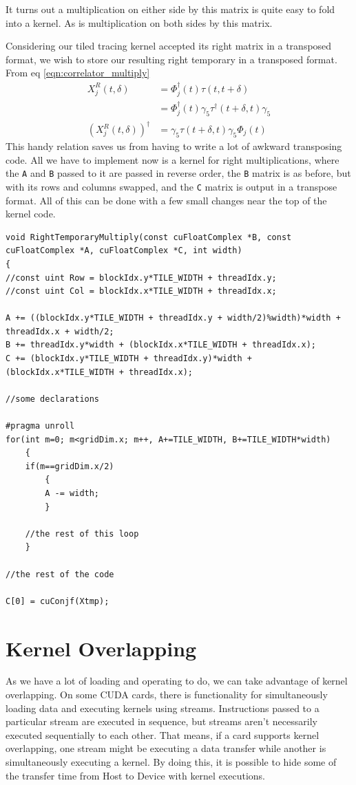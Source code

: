 \documentclass[a4paper,12pt]{report}
\begin{document}
It turns out a multiplication on either side by this matrix is quite easy to fold into a kernel.
As is multiplication on both sides by this matrix.

Considering our tiled tracing kernel accepted its right matrix in a transposed format, we wish to store our resulting right temporary in a transposed format.
From eq \ref{eqn:correlator_multiply}
%
\begin{align}
X^R_j(t,\delta) &=\Phi^\dagger_j(t) \tau(t,t+\delta)\\
		&=\Phi^\dagger_j(t) \gamma_5 \tau^\dagger(t+\delta, t ) \gamma_5\\
%
(X^R_j(t,\delta))^\dagger &= \gamma_5 \tau(t+\delta, t) \gamma_5 \Phi_j(t)
\end{align}
%
This handy relation saves us from having to write a lot of awkward transposing code.
All we have to implement now is a kernel for right multiplications, where the \verb!A! and \verb!B! passed to it are passed in reverse order, the \verb!B! matrix is as before, but with its rows and columns swapped, and the \verb!C! matrix is output in a transpose format.
All of this can be done with a few small changes near the top of the kernel code.

\begin{lstlisting}[float,caption=Multiplication Kernel To Generate The Right Temporary Matrices, label=lst:rightTemporary_kernel]
void RightTemporaryMultiply(const cuFloatComplex *B, const cuFloatComplex *A, cuFloatComplex *C, int width)
{
//const uint Row = blockIdx.y*TILE_WIDTH + threadIdx.y;
//const uint Col = blockIdx.x*TILE_WIDTH + threadIdx.x;

A += ((blockIdx.y*TILE_WIDTH + threadIdx.y + width/2)%width)*width + threadIdx.x + width/2;
B += threadIdx.y*width + (blockIdx.x*TILE_WIDTH + threadIdx.x);
C += (blockIdx.y*TILE_WIDTH + threadIdx.y)*width + (blockIdx.x*TILE_WIDTH + threadIdx.x);

//some declarations

#pragma unroll
for(int m=0; m<gridDim.x; m++, A+=TILE_WIDTH, B+=TILE_WIDTH*width)
	{
	if(m==gridDim.x/2)
		{
		A -= width;
		}
	
	//the rest of this loop
	}

//the rest of the code

C[0] = cuConjf(Xtmp);
\end{lstlisting}


\section{Kernel Overlapping}
As we have a lot of loading and operating to do, we can take advantage of kernel overlapping\cite[p~37]{ CUDA_C_Programming_Guide}.
On some CUDA cards, there is functionality for simultaneously loading data and executing kernels using streams.
Instructions passed to a particular stream are executed in sequence, but streams aren't necessarily executed sequentially to each other.
That means, if a card supports kernel overlapping, one stream might be executing a data transfer while another is simultaneously executing a kernel.
By doing this, it is possible to hide some of the transfer time from Host to Device with kernel executions.
\end{document}
